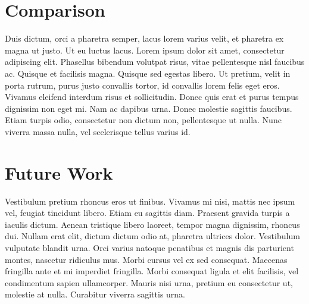 \section{Comparison}
Duis dictum, orci a pharetra semper, lacus lorem varius velit, et pharetra ex magna ut justo. Ut eu luctus lacus. Lorem ipsum dolor sit amet, consectetur adipiscing elit. Phasellus bibendum volutpat risus, vitae pellentesque nisl faucibus ac. Quisque et facilisis magna. Quisque sed egestas libero. Ut pretium, velit in porta rutrum, purus justo convallis tortor, id convallis lorem felis eget eros. Vivamus eleifend interdum risus et sollicitudin. Donec quis erat et purus tempus dignissim non eget mi. Nam ac dapibus urna. Donec molestie sagittis faucibus. Etiam turpis odio, consectetur non dictum non, pellentesque ut nulla. Nunc viverra massa nulla, vel scelerisque tellus varius id.

\section{Future Work}
Vestibulum pretium rhoncus eros ut finibus. Vivamus mi nisi, mattis nec ipsum vel, feugiat tincidunt libero. Etiam eu sagittis diam. Praesent gravida turpis a iaculis dictum. Aenean tristique libero laoreet, tempor magna dignissim, rhoncus dui. Nullam erat elit, dictum dictum odio at, pharetra ultrices dolor. Vestibulum vulputate blandit urna. Orci varius natoque penatibus et magnis dis parturient montes, nascetur ridiculus mus. Morbi cursus vel ex sed consequat. Maecenas fringilla ante et mi imperdiet fringilla. Morbi consequat ligula et elit facilisis, vel condimentum sapien ullamcorper. Mauris nisi urna, pretium eu consectetur ut, molestie at nulla. Curabitur viverra sagittis urna.